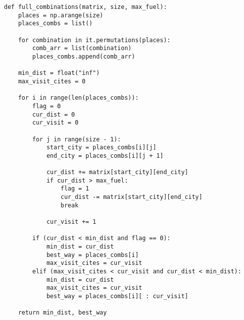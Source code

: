 \begin{lstlisting}[label=lst:full_comb,caption=Релизация алгоритма полного пербора]
    def full_combinations(matrix, size, max_fuel):
    places = np.arange(size)
    places_combs = list()

    for combination in it.permutations(places):
        comb_arr = list(combination)
        places_combs.append(comb_arr)

    min_dist = float("inf")
    max_visit_cites = 0

    for i in range(len(places_combs)):
        flag = 0
        cur_dist = 0
        cur_visit = 0

        for j in range(size - 1):
            start_city = places_combs[i][j]
            end_city = places_combs[i][j + 1]

            cur_dist += matrix[start_city][end_city]
            if cur_dist > max_fuel:
                flag = 1
                cur_dist -= matrix[start_city][end_city]
                break

            cur_visit += 1

        if (cur_dist < min_dist and flag == 0):
            min_dist = cur_dist
            best_way = places_combs[i]
            max_visit_cites = cur_visit
        elif (max_visit_cites < cur_visit and cur_dist < min_dist):
            min_dist = cur_dist
            max_visit_cites = cur_visit
            best_way = places_combs[i][ : cur_visit]

    return min_dist, best_way
\end{lstlisting}

